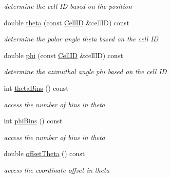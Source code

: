 \begin{DoxyCompactItemize}
\begin{DoxyCompactList}\small\item\em determine the cell ID based on the position \item\end{DoxyCompactList}\item 
double \hyperlink{class_d_d4hep_1_1_d_d_segmentation_1_1_projective_cylinder_aa4145f3b6bb017c50ff5f0102ebfd31f}{theta} (const \hyperlink{namespace_d_d4hep_1_1_d_d_segmentation_ac7af071d85cb48820914434a07e21ba1}{CellID} \&cellID) const 
\begin{DoxyCompactList}\small\item\em determine the polar angle theta based on the cell ID \item\end{DoxyCompactList}\item 
double \hyperlink{class_d_d4hep_1_1_d_d_segmentation_1_1_projective_cylinder_a249b8bf6a54b6a229332bc838d8abb41}{phi} (const \hyperlink{namespace_d_d4hep_1_1_d_d_segmentation_ac7af071d85cb48820914434a07e21ba1}{CellID} \&cellID) const 
\begin{DoxyCompactList}\small\item\em determine the azimuthal angle phi based on the cell ID \item\end{DoxyCompactList}\item 
int \hyperlink{class_d_d4hep_1_1_d_d_segmentation_1_1_projective_cylinder_a4fd2d5c187777527964abfeb79629eca}{thetaBins} () const 
\begin{DoxyCompactList}\small\item\em access the number of bins in theta \item\end{DoxyCompactList}\item 
int \hyperlink{class_d_d4hep_1_1_d_d_segmentation_1_1_projective_cylinder_acc41ce3d5dce7032b0985762f19605c6}{phiBins} () const 
\begin{DoxyCompactList}\small\item\em access the number of bins in theta \item\end{DoxyCompactList}\item 
double \hyperlink{class_d_d4hep_1_1_d_d_segmentation_1_1_projective_cylinder_a6e3faef329e433f8342e8e35c4a6b706}{offsetTheta} () const 
\begin{DoxyCompactList}\small\item\em access the coordinate offset in theta \item\end{DoxyCompactList}\item 

\end{DoxyCompactItemize}
